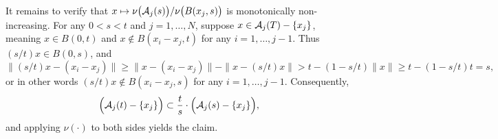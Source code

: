 	It remains to verify that $x \mapsto \nu\bigl(\mathcal{A}_j(s)\bigr)/\nu\bigl(B(x_j,s)\bigr)$ is monotonically non-increasing. For any $0 < s < t$ and $j = 1,\ldots,N$, suppose $x \in \mathcal{A}_j(T) - \{x_j\}$, meaning $x \in B(0,t)$ and $x \not\in B(x_i - x_j,t)$ for any $i = 1,\ldots,j - 1$. Thus $(s/t)x \in B(0,s)$, and
	\begin{equation*}
	\|(s/t)x - (x_i - x_j)\| \geq \|x - (x_i - x_j)\| - \|x - (s/t)x\| > t - (1 - s/t)\|x\| \geq t - (1 - s/t)t = s,
	\end{equation*}
	or in other words $(s/t)x \not\in B(x_i - x_j,s)$ for any $i = 1,\ldots,j - 1$. Consequently,
	\begin{equation*}
	\Bigl(\mathcal{A}_j(t) - \{x_j\}\Bigr) \subset \frac{t}{s} \cdot \Bigl(\mathcal{A}_{j}(s)- \{x_j\}\Bigr),
	\end{equation*}
	and applying $\nu(\cdot)$ to both sides yields the claim.
	
